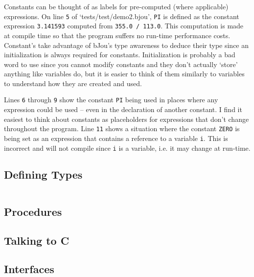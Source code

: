 \documentclass[12pt]{article}
\begin{document}
		Constants can be thought of as labels for pre-computed (where applicable) expressions. On line \texttt{5} of `tests/test/demo2.bjou', \texttt{PI} is defined as the constant expression \texttt{3.141593} computed from \texttt{355.0 / 113.0}. This computation is made at compile time so that the program suffers no run-time performance costs. Constant's take advantage of bJou's type awareness to deduce their type since an initialization is always required for constants. Initialization is probably a bad word to use since you cannot modify constants and they don't actually `store' anything like variables do, but it is easier to think of them similarly to variables to understand how they are created and used.
		
		Lines \texttt{6} through \texttt{9} show the constant \texttt{PI} being used in places where any expression could be used -- even in the declaration of another constant. I find it easiest to think about constants as placeholders for expressions that don't change throughout the program. Line \texttt{11} shows a situation where the constant \texttt{ZERO} is being set as an expression that contains a reference to a variable \texttt{i}. This is incorrect and will not compile since \texttt{i} is a variable, i.e. it may change at run-time.

	\subsection*{Defining Types}
		\begin{centering}
			\inputminted[breaklines, fontsize=\small, baselinestretch=0.8, frame=lines, linenos]{bash}{"../tests/test/demo3.bjou"}
		\end{centering}

	\subsection*{Procedures}

	\subsection*{Talking to C}

	\subsection*{Interfaces}
\end{document}
